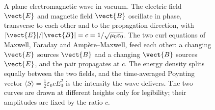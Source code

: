 \begin{figure}[htbp]
\centering
{}
\caption[Plane electromagnetic wave]{A plane electromagnetic wave in
vacuum. The electric field $\vect{E}$ and magnetic field $\vect{B}$
oscillate in phase, transverse to each other and to the propagation
direction, with $|\vect{E}|/|\vect{B}| = c = 1/\sqrt{\mu_0\varepsilon_0}$.
The two curl equations of Maxwell, Faraday and Amp\`ere--Maxwell, feed
each other: a changing $\vect{E}$ sources $\vect{B}$ and a changing
$\vect{B}$ sources $\vect{E}$, and the pair propagates at $c$. The energy
density splits equally between the two fields, and the time-averaged
Poynting vector $\langle S\rangle = \tfrac12\varepsilon_0 c E_0^2$ is the
intensity the wave delivers. The two curves are drawn at different
heights only for legibility; their amplitudes are fixed by the ratio
$c$.}
\label{fig:vol04ch08:em-wave}
\end{figure}
